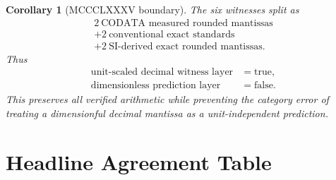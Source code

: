 \documentclass[11pt]{article}
\newtheorem{corollary}[theorem]{Corollary}
\begin{document}
\begin{corollary}[MCCCLXXXV boundary]\label{cor:unit_gauge_boundary}
The six witnesses split as
\[
  \begin{gathered}
  2\ \text{CODATA measured rounded mantissas}\\
  +2\ \text{conventional exact standards}\\
  +2\ \text{SI-derived exact rounded mantissas}.
  \end{gathered}
\]
Thus
\[
  \begin{aligned}
  \text{unit-scaled decimal witness layer}&=\mathrm{true},\\
  \text{dimensionless prediction layer}&=\mathrm{false}.
  \end{aligned}
\]
This preserves all verified arithmetic while preventing the category
error of treating a dimensionful decimal mantissa as a unit-independent
prediction.
\end{corollary}

\section{Headline Agreement Table}
\end{document}
